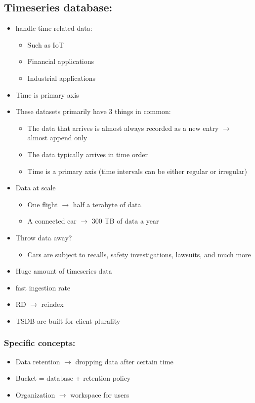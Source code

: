 \documentclass[12pt]{article}
\begin{document}
\subsection{Timeseries database:}
\begin{itemize}
    \item handle time-related data:\begin{itemize}
        \item Such as IoT 
        \item Financial applications 
        \item Industrial applications 
    \end{itemize}
    \item Time is primary axis 
    \item These datasets primarily have 3 things in common:\begin{itemize}
        \item The data that arrives is almost always recorded as a new entry $\rightarrow$ almost append only 
        \item The data typically arrives in time order 
        \item Time is a primary axis (time intervals can be either regular or irregular)
    \end{itemize}
    \item Data at scale\begin{itemize}
        \item One flight $\rightarrow$ half a terabyte of data 
        \item A connected car $\rightarrow$ 300 TB of data a year 
    \end{itemize}
    \item Throw data away?\begin{itemize}
        \item Cars are subject to recalls, safety investigations, lawsuits, and much more 
    \end{itemize}
    \item Huge amount of timeseries data
\end{itemize}
\begin{itemize}
    \item fast ingestion rate 
    \item RD $\rightarrow$ reindex 
    \item TSDB are built for client plurality 
\end{itemize}
\subsubsection{Specific concepts:}
\begin{itemize}
    \item Data retention $\rightarrow$ dropping data after certain time 
    \item Bucket = database + retention policy 
    \item Organization $\rightarrow$ workspace for users
\end{itemize}
\end{document}

